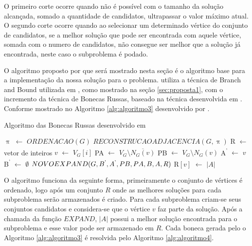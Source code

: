     O primeiro corte ocorre quando não é possível com o tamanho da solução alcançada, 
    somado a quantidade de candidatos, ultrapassar o valor máximo atual. O segundo corte ocorre quando ao selecionar um determinado vértice do conjunto de candidatos, se a 
    melhor solução que pode ser encontrada com aquele vértice, somada com o numero de 
    candidatos, não consegue ser melhor que a solução já encontrada, neste caso o 
    subproblema é podado.
    
    O algoritmo proposto por  que será mostrado nesta seção é o algoritmo base para a implementação da nossa solução para o problema.  utiliza a técnica de Branch and Bound utilizada em , como mostrado na seção \ref{sec:proposta1}, com o incremento da técnica de Bonecas Russas, baseado na técnica desenvolvida em . Conforme mostrado no Algoritmo \ref{alg:algoritmo3} desenvolvido por .
 
 
     \begin{algorithm}
        \caption{Algoritmo das Bonecas Russas desenvolvido em }
        \label{alg:algoritmo3}
            \begin{algorithmic}[1]
                    \State $\uppi$ $\gets$ $ORDENACAO(G)$
                    \State $RECONSTRUCAOADJACENCIA(G,\uppi)$
                    \State R $\gets$ vetor de inteiros
                    \State $v$ $\gets$ $V_G[i]$
                    \State PA $\gets$ $V_G \setminus \overline{N_G(v)}$
                    \State PB $\gets$ $V_G \setminus N_G(v)$
                    \State A\textsuperscript{'} $\gets$ $v$
                    \State B\textsuperscript{'} $\gets$ $\emptyset$
                    \State $NOVOEXPAND(G,B\textsuperscript{'},A\textsuperscript{'},PB,PA,B,A,R)$
                    \State R$[v]$ $\gets$ $|A|$
                    \EndFor
                \EndFunction
                
            \end{algorithmic}
    \end{algorithm}
 
 O algoritmo funciona da seguinte forma, primeiramente o conjunto de vértices é ordenado, logo após um conjunto $R$ onde as melhores soluções para cada subproblema serão armazenados é criado. Para cada subproblema criam-se seus conjuntos candidatos e considera-se que o vértice $v$ faz parte da solução. Após a chamada da função $EXPAND$, $|A|$ possui a melhor solução encontrada para o subproblema e esse valor pode ser armazenado em $R$. Cada boneca gerada pelo o Algoritmo \ref{alg:algoritmo3} é resolvida pelo Algoritmo \ref{alg:algoritmo4}. 
 
